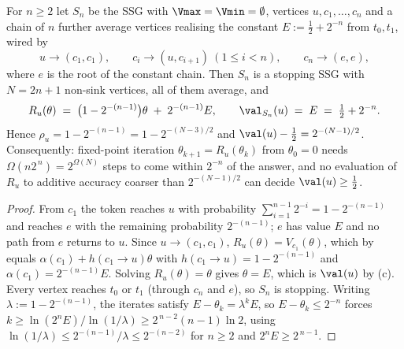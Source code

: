 \begin{theorem}\label{thm:bv-slow}
For $n\ge2$ let $S_n$ be the SSG with $\Vmax=\Vmin=\emptyset$, vertices
$u,c_1,\dots,c_n$ and a chain of $n$ further average vertices realising
the constant $E:=\tfrac12+2^{-n}$ from $t_0,t_1$, wired by
\[
  u\to(c_1,c_1),\qquad
  c_i\to(u,c_{i+1})\ (1\le i<n),\qquad
  c_n\to(e,e),
\]
where $e$ is the root of the constant chain. Then $S_n$ is a stopping SSG
with $N=2n+1$ non-sink vertices, all of them average, and
\[
  R_u(\theta)\;=\;\bigl(1-2^{-(n-1)}\bigr)\theta\;+\;2^{-(n-1)}E,
  \qquad
  \val_{S_n}(u)\;=\;E\;=\;\tfrac12+2^{-n}.
\]
Hence $\rho_u=1-2^{-(n-1)}=1-2^{-(N-3)/2}$ and
$\val(u)-\tfrac12=2^{-(N-1)/2}$. Consequently: fixed-point iteration
$\theta_{k+1}=R_u(\theta_k)$ from $\theta_0=0$ needs
$\Omega(n2^{\,n})=2^{\Omega(N)}$ steps to come within $2^{-n}$ of the
answer, and no evaluation of $R_u$ to additive accuracy coarser than
$2^{-(N-1)/2}$ can decide $\val(u)\ge\tfrac12$.
\end{theorem}

\begin{proof}
From $c_1$ the token reaches $u$ with probability
$\sum_{i=1}^{n-1}2^{-i}=1-2^{-(n-1)}$ and reaches $e$ with the remaining
probability $2^{-(n-1)}$; $e$ has value $E$ and no path from $e$ returns
to $u$. Since $u\to(c_1,c_1)$, $R_u(\theta)=V_{c_1}(\theta)$, which by
 equals $\alpha(c_1)+h(c_1\to u)\theta$ with
$h(c_1\to u)=1-2^{-(n-1)}$ and $\alpha(c_1)=2^{-(n-1)}E$. Solving
$R_u(\theta)=\theta$ gives $\theta=E$, which is $\val(u)$ by
(c). Every vertex reaches $t_0$ or $t_1$ (through
$c_n$ and $e$), so $S_n$ is stopping. Writing $\lambda:=1-2^{-(n-1)}$,
the iterates satisfy $E-\theta_k=\lambda^{k}E$, so
$E-\theta_k\le2^{-n}$ forces
$k\ge\ln(2^{n}E)/\ln(1/\lambda)\ge 2^{\,n-2}(n-1)\ln 2$, using
$\ln(1/\lambda)\le 2^{-(n-1)}/\lambda\le2^{-(n-2)}$ for $n\ge2$ and
$2^{n}E\ge2^{\,n-1}$.
\end{proof}

